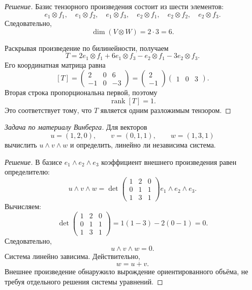 \begin{proof}[Решение]
Базис тензорного произведения состоит из шести элементов:
\[
e_1\otimes f_1,\quad
e_1\otimes f_2,\quad
e_1\otimes f_3,\quad
e_2\otimes f_1,\quad
e_2\otimes f_2,\quad
e_2\otimes f_3.
\]
Следовательно,
\[
\dim(V\otimes W)=2\cdot3=6.
\]

Раскрывая произведение по билинейности, получаем
\[
T
=
2e_1\otimes f_1
+6e_1\otimes f_3
-e_2\otimes f_1
-3e_2\otimes f_3.
\]
Его координатная матрица равна
\[
[T]
=
\begin{pmatrix}
2&0&6\\
-1&0&-3
\end{pmatrix}
=
\begin{pmatrix}
2\\-1
\end{pmatrix}
\begin{pmatrix}
1&0&3
\end{pmatrix}.
\]
Вторая строка пропорциональна первой, поэтому
\[
\operatorname{rank}[T]=1.
\]
Это соответствует тому, что \(T\) является одним разложимым тензором.
\end{proof}

\begin{problem}
\textit{Задача по материалу Винберга.}
Для векторов
\[
u=(1,2,0),
\qquad
v=(0,1,1),
\qquad
w=(1,3,1)
\]
вычислить \(u\wedge v\wedge w\) и определить, линейно ли независима система.
\end{problem}

\begin{proof}[Решение]
В базисе \(e_1\wedge e_2\wedge e_3\) коэффициент внешнего произведения равен определителю:
\[
u\wedge v\wedge w
=
\det
\begin{pmatrix}
1&2&0\\
0&1&1\\
1&3&1
\end{pmatrix}
e_1\wedge e_2\wedge e_3.
\]
Вычисляем:
\[
\det
\begin{pmatrix}
1&2&0\\
0&1&1\\
1&3&1
\end{pmatrix}
=
1(1-3)-2(0-1)=0.
\]
Следовательно,
\[
u\wedge v\wedge w=0.
\]
Система линейно зависима. Действительно,
\[
w=u+v.
\]
Внешнее произведение обнаружило вырождение ориентированного объёма, не требуя отдельного решения системы уравнений.
\end{proof}


